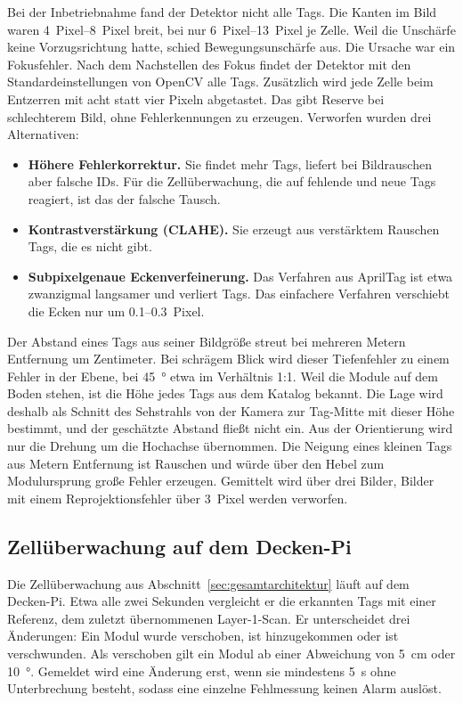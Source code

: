 Bei der Inbetriebnahme fand der Detektor nicht alle Tags. Die Kanten im Bild waren \SIrange{4}{8}{Pixel} breit, bei nur \SIrange{6}{13}{Pixel} je Zelle. Weil die Unschärfe keine Vorzugsrichtung hatte, schied Bewegungsunschärfe aus. Die Ursache war ein Fokusfehler. Nach dem Nachstellen des Fokus findet der Detektor mit den Standardeinstellungen von OpenCV alle Tags. Zusätzlich wird jede Zelle beim Entzerren mit acht statt vier Pixeln abgetastet. Das gibt Reserve bei schlechterem Bild, ohne Fehlerkennungen zu erzeugen. Verworfen wurden drei Alternativen:
\begin{itemize}
    \item \textbf{Höhere Fehlerkorrektur.} Sie findet mehr Tags, liefert bei Bildrauschen aber falsche IDs. Für die Zellüberwachung, die auf fehlende und neue Tags reagiert, ist das der falsche Tausch.
    \item \textbf{Kontrastverstärkung (CLAHE).} Sie erzeugt aus verstärktem Rauschen Tags, die es nicht gibt.
    \item \textbf{Subpixelgenaue Eckenverfeinerung.} Das Verfahren aus AprilTag ist etwa zwanzigmal langsamer und verliert Tags. Das einfachere Verfahren verschiebt die Ecken nur um \numrange{0,1}{0,3}~Pixel.
\end{itemize}

Der Abstand eines Tags aus seiner Bildgröße streut bei mehreren Metern Entfernung um Zentimeter. Bei schrägem Blick wird dieser Tiefenfehler zu einem Fehler in der Ebene, bei \SI{45}{\degree} etwa im Verhältnis 1:1. Weil die Module auf dem Boden stehen, ist die Höhe jedes Tags aus dem Katalog bekannt. Die Lage wird deshalb als Schnitt des Sehstrahls von der Kamera zur Tag-Mitte mit dieser Höhe bestimmt, und der geschätzte Abstand fließt nicht ein. Aus der Orientierung wird nur die Drehung um die Hochachse übernommen. Die Neigung eines kleinen Tags aus Metern Entfernung ist Rauschen und würde über den Hebel zum Modulursprung große Fehler erzeugen. Gemittelt wird über drei Bilder, Bilder mit einem Reprojektionsfehler über \SI{3}{Pixel} werden verworfen.

\subsection{Zellüberwachung auf dem Decken-Pi}
\label{subsec:bv-zellueberwachung}
Die Zellüberwachung aus Abschnitt~\ref{sec:gesamtarchitektur} läuft auf dem Decken-Pi. Etwa alle zwei Sekunden vergleicht er die erkannten Tags mit einer Referenz, dem zuletzt übernommenen Layer-1-Scan. Er unterscheidet drei Änderungen: Ein Modul wurde verschoben, ist hinzugekommen oder ist verschwunden. Als verschoben gilt ein Modul ab einer Abweichung von \SI{5}{\centi\metre} oder \SI{10}{\degree}. Gemeldet wird eine Änderung erst, wenn sie mindestens \SI{5}{\second} ohne Unterbrechung besteht, sodass eine einzelne Fehlmessung keinen Alarm auslöst. 

